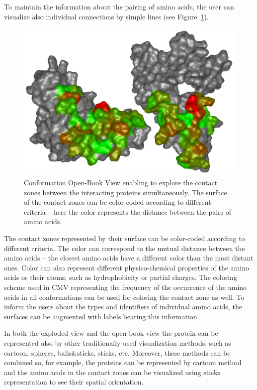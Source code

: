 \documentclass[journal]{vgtc}                %
\begin{document}
To maintain the information about the pairing of amino acids, the user can visualize also individual connections by simple lines (see Figure~\ref{fig:book}).

\begin{figure}[bt]
  \centering
  \includegraphics[width=0.8\columnwidth]{book.png}
  \caption{Conformation Open-Book View enabling to explore the contact zones between the interacting proteins simultaneously. The surface of the contact zones can be color-coded according to different criteria -- here the color represents the distance between the pairs of amino acids.}
  \label{fig:book}
\end{figure}

The contact zones represented by their surface can be color-coded according to different criteria.
The color can correspond to the mutual distance between the amino acids -- the closest amino acids have a different color than the most distant ones.
Color can also represent different physico-chemical properties of the amino acids or their atoms, such as hydrophobicity or partial charges.
The coloring scheme used in CMV representing the frequency of the occurrence of the amino acids in all conformations can be used for coloring the contact zone as well.
To inform the users about the types and identifiers of individual amino acids, the surfaces can be augmented with labels bearing this information.

In both the exploded view and the open-book view the protein can be represented also by other traditionally used visualization methods, such as cartoon, spheres, balls\&sticks, sticks, etc.
Moreover, these methods can be combined so, for example, the proteins can be represented by cartoon method and the amino acids in the contact zones can be visualized using sticks representation to see their spatial orientation.%
\end{document}
